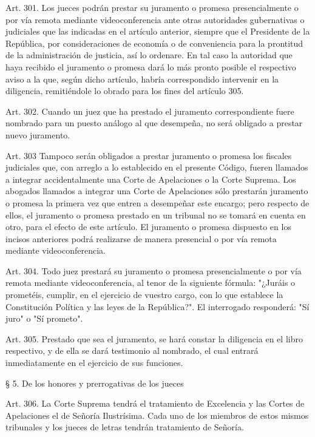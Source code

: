     Art. 301. Los jueces podrán prestar su juramento o promesa presencialmente o por vía remota mediante videoconferencia ante otras autoridades gubernativas o judiciales que las indicadas en el artículo anterior, siempre que el Presidente de la República, por consideraciones de economía o de conveniencia para la prontitud de la administración de justicia, así lo ordenare.
    En tal caso la autoridad que haya recibido el juramento o promesa dará lo más pronto posible el respectivo aviso a la que, según dicho artículo, habría correspondido intervenir en la diligencia, remitiéndole lo obrado para los fines del artículo 305.


    Art. 302. Cuando un juez que ha prestado el juramento correspondiente fuere nombrado para un puesto análogo al que desempeña, no será obligado a prestar nuevo juramento.


    Art. 303 Tampoco serán obligados a prestar juramento o promesa los fiscales judiciales que, con arreglo a lo establecido en el presente Código, fueren llamados a integrar accidentalmente una Corte de Apelaciones o la Corte Suprema.
    Los abogados llamados a integrar una Corte de Apelaciones sólo prestarán juramento o promesa la primera vez que entren a desempeñar este encargo; pero respecto de ellos, el juramento o promesa prestado en un tribunal no se tomará en cuenta en otro, para el efecto de este artículo.
    El juramento o promesa dispuesto en los incisos anteriores podrá realizarse de manera presencial o por vía remota mediante videoconferencia.


    Art. 304. Todo juez prestará su juramento o promesa presencialmente o por vía remota mediante videoconferencia, al tenor de la siguiente fórmula:
    "¿Juráis o prometéis, cumplir, en el ejercicio de vuestro cargo, con lo que establece la Constitución Política y las leyes de la República?".
    El interrogado responderá: "Sí juro" o "Sí prometo".


    Art. 305. Prestado que sea el juramento, se hará constar la diligencia en el libro respectivo, y de ella se dará testimonio al nombrado, el cual entrará inmediatamente en el ejercicio de sus funciones.

    § 5. De los honores y prerrogativas de los jueces


    Art. 306. La Corte Suprema tendrá el tratamiento de Excelencia y las Cortes de Apelaciones el de Señoría Ilustrísima.
    Cada uno de los miembros de estos mismos tribunales y los jueces de letras tendrán tratamiento de Señoría.

